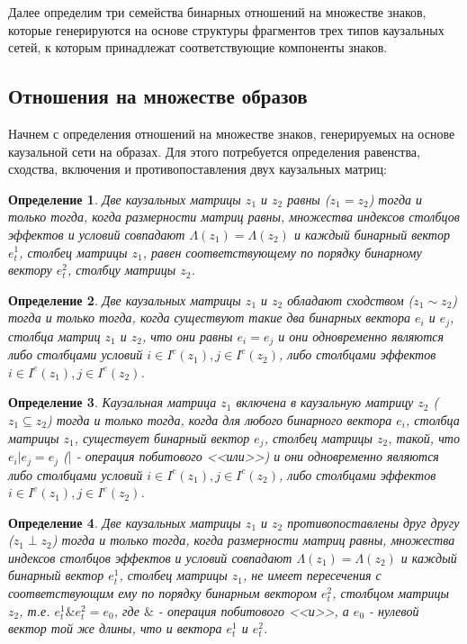 \documentclass[12pt]{scrartcl}
\newtheorem{definition}{Определение}
\begin{document}
	Далее определим три семейства бинарных отношений на множестве знаков, которые  генерируются на основе структуры фрагментов трех типов каузальных сетей, к которым принадлежат соответствующие компоненты знаков.
		
	\subsection{Отношения на множестве образов}	
	
	Начнем с определения отношений на множестве знаков, генерируемых на основе каузальной сети на образах. Для этого потребуется определения равенства, сходства, включения и противопоставления двух каузальных матриц:
	
	\begin{definition}
		Две каузальных матрицы $z_1$ и $z_2$ равны ($z_1=z_2$) тогда и только тогда, когда размерности матриц равны, множества индексов столбцов эффектов и условий совпадают $\Lambda({z_1})=\Lambda({z_2})$ и каждый бинарный вектор $e_t^1$, столбец матрицы $z_1$, равен соответствующему по порядку бинарному вектору $e_t^2$, столбцу матрицы $z_2$.
	\end{definition}
	
	\begin{definition}
		Две каузальных матрицы $z_1$ и $z_2$ обладают сходством ($z_1\sim z_2$) тогда и только тогда, когда  существуют такие два бинарных вектора $e_i$ и $e_j$, столбца матриц $z_1$ и $z_2$, что они равны $e_i=e_j$ и они одновременно являются либо столбцами условий $i\in I^c(z_1), j\in I^c(z_2)$, либо столбцами эффектов $i\in I^e(z_1), j\in I^e(z_2)$.
	\end{definition}
	
	\begin{definition}
		Каузальная матрица $z_1$ включена в каузальную матрицу $z_2$ ($z_1\subseteq z_2$) тогда и только тогда, когда  для любого бинарного вектора $e_i$, столбца матрицы $z_1$, существует бинарный вектор $e_j$, столбец матрицы $z_2$, такой, что $e_i | e_j=e_j$ ($|$ - операция побитового <<или>>) и они одновременно являются либо столбцами условий $i\in I^c(z_1), j\in I^c(z_2)$, либо столбцами эффектов $i\in I^e(z_1), j\in I^e(z_2)$.
	\end{definition}
	
	\begin{definition}
		Две каузальных матрицы $z_1$ и $z_2$ противопоставлены друг другу ($z_1\perp z_2$) тогда и только тогда, когда размерности матриц равны, множества индексов столбцов эффектов и условий совпадают $\Lambda({z_1})=\Lambda({z_2})$ и каждый бинарный вектор $e_t^1$, столбец матрицы $z_1$, не имеет пересечения с соответствующим ему по порядку бинарным вектором $e_t^2$, столбцом матрицы $z_2$, т.е. $e_t^1\& e_t^2=e_0$, где $\&$ - операция побитового <<и>>, а $e_0$ - нулевой вектор той же длины, что и вектора $e_t^1$ и $e_t^2$.
	\end{definition}
	
\end{document}
